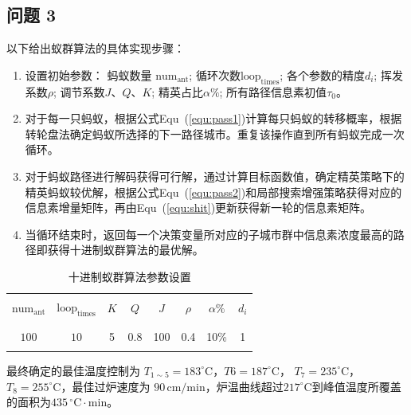 \documentclass[../main.tex]{subfiles}
\begin{document}
\subsection{问题 3}
以下给出蚁群算法的具体实现步骤：
\begin{enumerate}
	\item 设置初始参数：
	蚂蚁数量 \(\mathrm{num}_{\mathrm{ant}}\); 循环次数\(\mathrm{loop}_{\mathrm{times}}\); 各个参数的精度\(d_i\); 挥发系数\(\rho\); 调节系数\(J\)、\(Q\)、\(K\); 精英占比\(\alpha  \%\); 所有路径信息素初值\(τ_0\)。
	\item 对于每一只蚂蚁，根据公式Equ~(\ref{equ:pass1})计算每只蚂蚁的转移概率，根据转轮盘法确定蚂蚁所选择的下一路径城市。重复该操作直到所有蚂蚁完成一次循环。
	\item 对于蚂蚁路径进行解码获得可行解，通过计算目标函数值，确定精英策略下的精英蚂蚁较优解，根据公式Equ~(\ref{equ:pass2})和局部搜索增强策略获得对应的信息素增量矩阵，再由Equ~(\ref{equ:shit})更新获得新一轮的信息素矩阵。
	\item 当循环结束时，返回每一个决策变量所对应的子城市群中信息素浓度最高的路径即获得十进制蚁群算法的最优解。
\end{enumerate}
\begin{table}[H]
	\centering
	\begin{tabular}{cccccccc} 
	\hline 	\hline
	\\[-1em]

	\(\mathrm{num}_{\mathrm{ant}}\) & \(\mathrm{loop}_{\mathrm{times}}\) & \(K\) & \(Q\) & \(J\) & \(\rho\) & \(\alpha\%\) & \(d_{i}\) \\
	\\[-1em]
	\hline
	\\[-1em]
	 \(100\)  & \(10\)  & 5  & 0.8  & 100  & 0.4  & 10\%  & 1 
	\\[-1em]
	\\ \hline
	\end{tabular}
	\caption{十进制蚁群算法参数设置}
\end{table}
最终确定的最佳温度控制为 \(T _{1 \sim 5}= 183 ^{\circ}\mathrm{C}\)，\(T6 = 187^{\circ}\mathrm{C}\)，
\(T_{7} = 235^{\circ}\mathrm{C}\)，\(T_8 = 255^{\circ}\mathrm{C}\)，最佳过炉速度为 \(90\,\mathrm{cm}/\mathrm{min}\)，炉温曲线超过\(217 ^{\circ}\mathrm{C}\)到峰值温度所覆盖的面积为\(435\,^{\circ}\mathrm{C} \cdot \mathrm{min}\)。
\end{document}
